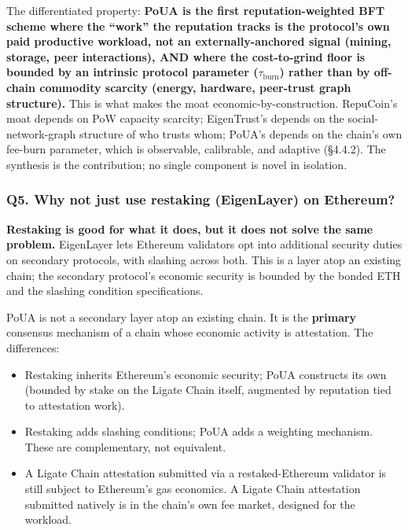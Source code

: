 \documentclass[
  11pt,
]{article}
\providecommand{\tightlist}{%
  \setlength{\itemsep}{0pt}\setlength{\parskip}{0pt}}
\begin{document}
The differentiated property: \textbf{PoUA is the first
reputation-weighted BFT scheme where the ``work'' the reputation tracks
is the protocol's own paid productive workload, not an
externally-anchored signal (mining, storage, peer interactions), AND
where the cost-to-grind floor is bounded by an intrinsic protocol
parameter (\(\tau_{\text{burn}}\)) rather than by off-chain commodity
scarcity (energy, hardware, peer-trust graph structure).} This is what
makes the moat economic-by-construction. RepuCoin's moat depends on PoW
capacity scarcity; EigenTrust's depends on the social-network-graph
structure of who trusts whom; PoUA's depends on the chain's own fee-burn
parameter, which is observable, calibrable, and adaptive (§4.4.2). The
synthesis is the contribution; no single component is novel in
isolation.

\subsubsection{Q5. Why not just use restaking (EigenLayer) on
Ethereum?}\label{q5.-why-not-just-use-restaking-eigenlayer-on-ethereum}

\textbf{Restaking is good for what it does, but it does not solve the
same problem.} EigenLayer lets Ethereum validators opt into additional
security duties on secondary protocols, with slashing across both. This
is a layer atop an existing chain; the secondary protocol's economic
security is bounded by the bonded ETH and the slashing condition
specifications.

PoUA is not a secondary layer atop an existing chain. It is the
\textbf{primary} consensus mechanism of a chain whose economic activity
is attestation. The differences:

\begin{itemize}
\tightlist
\item
  Restaking inherits Ethereum's economic security; PoUA constructs its
  own (bounded by stake on the Ligate Chain itself, augmented by
  reputation tied to attestation work).
\item
  Restaking adds slashing conditions; PoUA adds a weighting mechanism.
  These are complementary, not equivalent.
\item
  A Ligate Chain attestation submitted via a restaked-Ethereum validator
  is still subject to Ethereum's gas economics. A Ligate Chain
  attestation submitted natively is in the chain's own fee market,
  designed for the workload.
\end{itemize}
\end{document}
